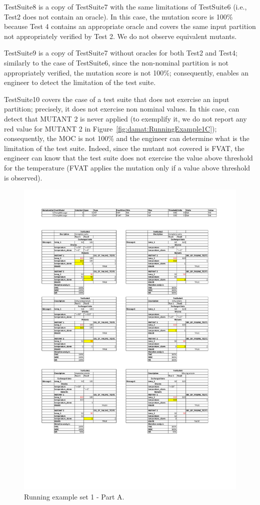 TestSuite8 is a copy of TestSuite7 with the same limitations of TestSuite6 (i.e., Test2 does not contain an oracle).
In this case, the mutation score is 100\% because Test 4 contains an appropriate oracle and covers the same input partition not appropriately verified by Test 2. We do not observe equivalent mutants.

TestSuite9 is a copy of TestSuite7 without oracles for both Test2 and Test4; similarly to the case of TestSuite6, since the non-nominal partition is not appropriately verified, the mutation score is not 100\%; consequently, \APPR enables an engineer to detect the limitation of the test suite.

TestSuite10 covers the case of a test suite that does not exercise an input partition; precisely, it does not exercise non nominal values. 
In this case, \APPR can detect that MUTANT 2 is never applied (to exemplify it, we do not report any red value for MUTANT 2 in Figure~\ref{fig:damat:RunningExample1C}); consequently, the MOC is not 100\% and the engineer can determine what is the limitation of the test suite. Indeed, since the mutant not covered is FVAT, the engineer can know that the test suite does not exercise the value above threshold for the temperature (FVAT applies the mutation only if a value above threshold is observed).

\begin{figure}[tb]
\centering
\includegraphics[width=18cm]{damat/DataDrivenExample1A}
\caption{Running example set 1 - Part A.}
\label{fig:damat:RunningExample1A}
\end{figure}

